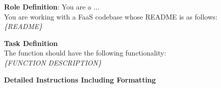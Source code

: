 \begin{tcolorbox}[colback=orange!5!white, colframe=orange!95!white, colbacktitle=orange!95!white, title=Zero Shot with README, width=\linewidth]
\small
    \textbf{Role Definition}: You are a ...\\
    You are working with a FaaS codebase whose README is as follows:\\
    \textit{\{README\}}

    \tcblower 
\small
    \textbf{Task Definition}\\
    The function should have the following functionality:\\
    \textit{\{FUNCTION DESCRIPTION\}}
    
    \textbf{Detailed Instructions Including Formatting}
  \normalsize
\end{tcolorbox}
\begin{minipage}{\linewidth}
\label{box:type1}
\end{minipage}